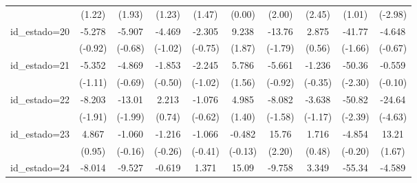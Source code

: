 {\begin{tabular}{l*{9}{c}}
                    &      (1.22)         &      (1.93)         &      (1.23)         &      (1.47)         &      (0.00)         &      (2.00)         &      (2.45)         &      (1.01)         &     (-2.98)         \\
[1em]
id\_estado=20        &      -5.278         &      -5.907         &      -4.469         &      -2.305         &       9.238         &      -13.76         &       2.875         &      -41.77         &      -4.648         \\
                    &     (-0.92)         &     (-0.68)         &     (-1.02)         &     (-0.75)         &      (1.87)         &     (-1.79)         &      (0.56)         &     (-1.66)         &     (-0.67)         \\
[1em]
id\_estado=21        &      -5.352         &      -4.869         &      -1.853         &      -2.245         &       5.786         &      -5.661         &      -1.236         &      -50.36\sym{*}  &      -0.559         \\
                    &     (-1.11)         &     (-0.69)         &     (-0.50)         &     (-1.02)         &      (1.56)         &     (-0.92)         &     (-0.35)         &     (-2.30)         &     (-0.10)         \\
[1em]
id\_estado=22        &      -8.203         &      -13.01\sym{*}  &       2.213         &      -1.076         &       4.985         &      -8.082         &      -3.638         &      -50.82\sym{*}  &      -24.64\sym{***}\\
                    &     (-1.91)         &     (-1.99)         &      (0.74)         &     (-0.62)         &      (1.40)         &     (-1.58)         &     (-1.17)         &     (-2.39)         &     (-4.63)         \\
[1em]
id\_estado=23        &       4.867         &      -1.060         &      -1.216         &      -1.066         &      -0.482         &       15.76\sym{*}  &       1.716         &      -4.854         &       13.21         \\
                    &      (0.95)         &     (-0.16)         &     (-0.26)         &     (-0.41)         &     (-0.13)         &      (2.20)         &      (0.48)         &     (-0.20)         &      (1.67)         \\
[1em]
id\_estado=24        &      -8.014         &      -9.527         &      -0.619         &       1.371         &       15.09\sym{***}&      -9.758         &       3.349         &      -55.34\sym{*}  &      -4.589         \\

\end{tabular}}
